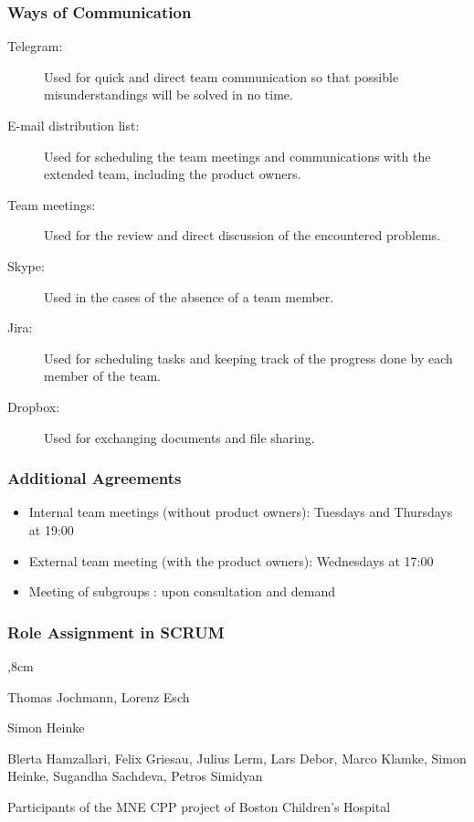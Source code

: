 \subsubsection{Ways of Communication}
\begin{description}
	\item[Telegram:] Used for quick and direct team communication so that possible misunderstandings will be solved in no time.
	
	\item[E-mail distribution list:] Used for scheduling the team meetings and communications with the extended team, including the product owners. 
	
	\item[Team meetings:] Used for the review and direct discussion of the encountered problems. 
	
	\item[Skype:] Used in the cases of the absence of a team member. 
	
	\item [Jira:] Used for scheduling tasks and keeping track of the progress done by each member of the team.
	
	\item[Dropbox:] Used for exchanging documents and file sharing.  
\end{description}

\subsubsection{Additional Agreements}
\begin{itemize}
	\item Internal team meetings (without product owners): Tuesdays and Thursdays at 19:00
	
	\item External team meeting (with the product owners): Wednesdays at 17:00
	
	\item Meeting of subgroups : upon consultation and demand 
\end{itemize}

\subsubsection{Role Assignment in SCRUM}

\begin{description}
	,8cm
	\item[Product Owner:] Thomas Jochmann, Lorenz Esch
	
	\item[Scrum Master:] Simon Heinke
	
	\item[Development team:] Blerta Hamzallari, Felix Griesau, Julius Lerm, Lars Debor, Marco Klamke, Simon Heinke, Sugandha Sachdeva, Petros Simidyan
	
	\item[Client, User:] Participants of the MNE CPP project of Boston Children's Hospital
	
\end{description}


